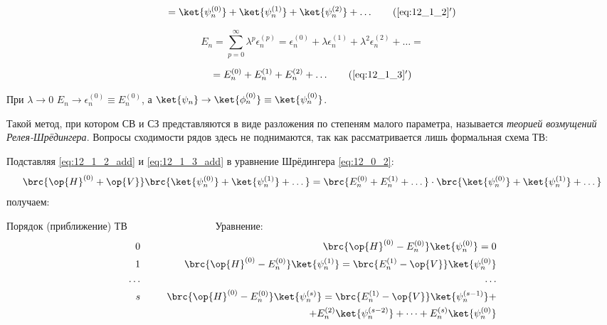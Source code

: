 \begin{equation}
\label{eq:12_1_2_add}
= \ket{\psi_n^{(0)}} + \ket{\psi_n^{(1)}} + \ket{\psi_n^{(2)}} + \dots
\tag{\ref{eq:12_1_2}$'$}
\end{equation}

\begin{equation}
\label{eq:12_1_3}
E_n = \sum_{p=0}^{\infty} \lambda^p \epsilon_n^{(p)} = \epsilon_n^{(0)} + \lambda \epsilon_n^{(1)} + \lambda^2 \epsilon_n^{(2)} + \dots = 
\end{equation}

\begin{equation}
\label{eq:12_1_3_add}
= E_n^{(0)} + E_n^{(1)} + E_n^{(2)} + \dots
\tag{\ref{eq:12_1_3}$'$}
\end{equation}

При $\lambda \to 0$ $E_n \to \epsilon_n^{(0)} \equiv E_n^{(0)}$, а $\ket{\psi_n} \to \ket{\phi_n^{(0)}} \equiv \ket{\psi_n^{(0)}}$.

Такой метод, при котором СВ и СЗ представляются в виде разложения по степеням малого параметра, называется {\em теорией возмущений Релея-Шрёдингера}\footnotemark{}. Вопросы сходимости рядов здесь не поднимаются, так как рассматривается лишь формальная схема ТВ:

Подставляя \eqref{eq:12_1_2_add} и \eqref{eq:12_1_3_add} в уравнение Шрёдингера \eqref{eq:12_0_2}:
$$
\brc{\op{H}^{(0)} + \op{V}} \brc{\ket{\psi_n^{(0)}} + \ket{\psi_n^{(1)}} + \dots} = \brc{E_n^{(0)} + E_n^{(1)} + \dots} \cdot \brc{\ket{\psi_n^{(0)}} + \ket{\psi_n^{(1)}} + \dots}
$$
получаем:

Порядок (приближение) ТВ ~~~~~~~~~~~~~~~~~Уравнение:
\begin{eqnarray}
\label{eq:12_1_4} 0 &~~~~~& \brc{\op{H}^{(0)} - E_n^{(0)}} \ket{\psi_n^{(0)}} = 0\\
\label{eq:12_1_5} 1 &~~~~~& \brc{\op{H}^{(0)} - E_n^{(0)}} \ket{\psi_n^{(1)}} = \brc{E_n^{(1)} - \op{V}} \ket{\psi_n^{(0)}} \\
\dots &~&~~~\dots \nonumber \\
 \label{eq:12_1_6} s&~& \brc{\op{H}^{(0)} - E_n^{(0)}} \ket{\psi_n^{(s)}} = \brc{E_n^{(1)} - \op{V}} \ket{\psi_n^{(s-1)}}  + \\
                     &~&+ E_n^{(2)}\ket{\psi_n^{(s-2)}}+\dots+ E_n^{(s)}\ket{\psi_n^{(0)}} \nonumber
\end{eqnarray}

